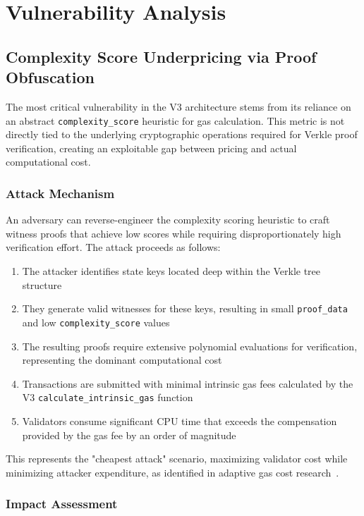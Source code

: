 \documentclass{article}
\begin{document}
\section{Vulnerability Analysis}

\subsection{Complexity Score Underpricing via Proof Obfuscation}

The most critical vulnerability in the V3 architecture stems from its reliance on an abstract \texttt{complexity\_score} heuristic for gas calculation. This metric is not directly tied to the underlying cryptographic operations required for Verkle proof verification, creating an exploitable gap between pricing and actual computational cost.

\subsubsection{Attack Mechanism}

An adversary can reverse-engineer the complexity scoring heuristic to craft witness proofs that achieve low scores while requiring disproportionately high verification effort. The attack proceeds as follows:

\begin{enumerate}
\item The attacker identifies state keys located deep within the Verkle tree structure
\item They generate valid witnesses for these keys, resulting in small \texttt{proof\_data} and low \texttt{complexity\_score} values
\item The resulting proofs require extensive polynomial evaluations for verification, representing the dominant computational cost
\item Transactions are submitted with minimal intrinsic gas fees calculated by the V3 \texttt{calculate\_intrinsic\_gas} function
\item Validators consume significant CPU time that exceeds the compensation provided by the gas fee by an order of magnitude
\end{enumerate}

This represents the "cheapest attack" scenario, maximizing validator cost while minimizing attacker expenditure, as identified in adaptive gas cost research~\cite{chen2017adaptive}.

\subsubsection{Impact Assessment}
\end{document}
